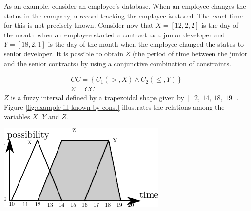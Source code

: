 \begin{example}
As an example, consider an employee's database. When an employee changes the status in the company, a record tracking the employee is stored. The exact time for this is not precisely known. Consider now that $X = \left[12, 2, 2\right]$ is the day of the month when an employee started a contract as a junior developer and $Y = \left[18, 2, 1 \right]$ is the day of the month when the employee changed the status to senior developer. It is possible to obtain $Z$ (the period of time between the junior and the senior contracts) by using a conjunctive combination of constraints.

\begin{align}
\nonumber
CC = \left \lbrace C_1\left(>,X\right) \wedge C_2(\leq,Y) \right \rbrace \\
\nonumber
Z = CC
\end{align}
$Z$ is a fuzzy interval defined by a trapezoidal shape given by $\left[12,\ 14,\ 18,\ 19 \right]$.
Figure \ref{fig:example-ill-known-by-const} illustrates the relations among the variables $X$, $Y$ and $Z$.
\end{example}

\begin{samepage}
\vspace*{13pt}
\begin{center}
{
\includegraphics[scale=1]{./graphs/ill-known-by-constraints.pdf}

}
\end{center}
\vspace*{10pt}
\vspace*{13pt}
\end{samepage}

